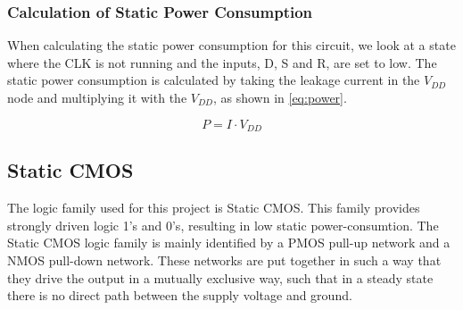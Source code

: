 \subsubsection{Calculation of Static Power Consumption}
When calculating the static power consumption for this circuit, we look at a state where the CLK is not running and the inputs, D, S and R, are set to low. The static power consumption is calculated by taking the leakage current in the $V_{DD}$ node and multiplying it with the $V_{DD}$, as shown in \autoref{eq:power}.

\begin{equation}
    \label{eq:power}
    P = I \cdot V_{DD}
\end{equation}

\subsection{Static CMOS}\label{subsec:static_cmos}

The logic family used for this project is Static CMOS. This family provides strongly driven logic 1's and 0's, resulting in low static power-consumtion. The Static CMOS logic family is mainly identified by a PMOS pull-up network and a NMOS pull-down network. These networks are put together in such a way that they drive the output in a mutually exclusive way, such that in a steady state there is no direct path between the supply voltage and ground.



